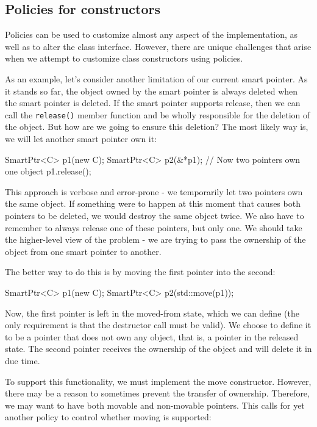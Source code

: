 \subsection{Policies for constructors}

Policies can be used to customize almost any aspect of the implementation, as well as to alter the class interface. However, there are unique challenges that arise when we attempt to customize class constructors using policies.

As an example, let's consider another limitation of our current smart pointer. As it stands so far, the object owned by the smart pointer is always deleted when the smart pointer is deleted. If the smart pointer supports release, then we can call the \texttt{release()} member function and be wholly responsible for the deletion of the object. But how are we going to ensure this deletion? The most likely way is, we will let another smart pointer own it:

\begin{code}
SmartPtr<C> p1(new C);
SmartPtr<C> p2(&*p1); // Now two pointers own one object
p1.release();
\end{code}

This approach is verbose and error-prone - we temporarily let two pointers own the same object. If something were to happen at this moment that causes both pointers to be deleted, we would destroy the same object twice. We also have to remember to always release one of these pointers, but only one. We should take the higher-level view of the problem - we are trying to pass the ownership of the object from one smart pointer to another.

The better way to do this is by moving the first pointer into the second:

\begin{code}
SmartPtr<C> p1(new C);
SmartPtr<C> p2(std::move(p1));
\end{code}

Now, the first pointer is left in the moved-from state, which we can define (the only requirement is that the destructor call must be valid). We choose to define it to be a pointer that does not own any object, that is, a pointer in the released state. The second pointer receives the ownership of the object and will delete it in due time.

To support this functionality, we must implement the move constructor. However, there may be a reason to sometimes prevent the transfer of ownership. Therefore, we may want to have both movable and non-movable pointers. This calls for yet another policy to control whether moving is supported:


